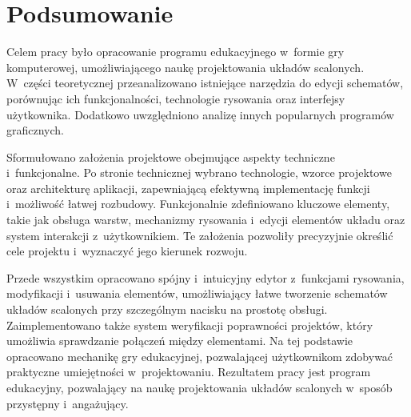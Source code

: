 \chapter{Podsumowanie}
\label{ch:podsumowanie}

Celem pracy było opracowanie programu edukacyjnego w~formie gry komputerowej,
umożliwiającego naukę projektowania układów scalonych.
W~części teoretycznej przeanalizowano istniejące narzędzia do edycji schematów,
porównując ich funkcjonalności, technologie rysowania oraz interfejsy użytkownika.
Dodatkowo uwzględniono analizę innych popularnych programów graficznych.


Sformułowano założenia projektowe obejmujące aspekty techniczne i~funkcjonalne.
Po stronie technicznej wybrano technologie,
wzorce projektowe oraz architekturę aplikacji,
zapewniającą efektywną implementację funkcji i~możliwość łatwej rozbudowy.
Funkcjonalnie zdefiniowano kluczowe elementy, takie jak obsługa warstw,
mechanizmy rysowania i~edycji elementów układu oraz system interakcji z~użytkownikiem.
Te założenia pozwoliły precyzyjnie określić cele projektu i~wyznaczyć jego kierunek rozwoju.



Przede wszystkim opracowano spójny i~intuicyjny edytor z~funkcjami rysowania,
modyfikacji i~usuwania elementów,
umożliwiający łatwe tworzenie schematów układów scalonych przy szczególnym nacisku na prostotę obsługi.
Zaimplementowano także system weryfikacji poprawności projektów,
który umożliwia sprawdzanie połączeń między elementami.
Na tej podstawie opracowano mechanikę gry edukacyjnej,
pozwalającej użytkownikom zdobywać praktyczne umiejętności w~projektowaniu.
Rezultatem pracy jest program edukacyjny,
pozwalający na naukę projektowania układów scalonych w~sposób przystępny i~angażujący.


